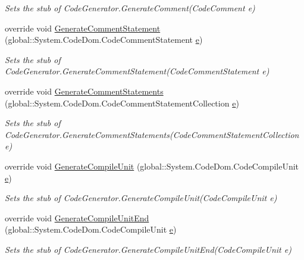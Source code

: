 \begin{DoxyCompactItemize}
\begin{DoxyCompactList}\small\item\em Sets the stub of Code\-Generator.\-Generate\-Comment(\-Code\-Comment e)\end{DoxyCompactList}\item 
override void \hyperlink{class_system_1_1_code_dom_1_1_compiler_1_1_fakes_1_1_stub_code_generator_aa9482055f9a2cd750742792045463463}{Generate\-Comment\-Statement} (global\-::\-System.\-Code\-Dom.\-Code\-Comment\-Statement \hyperlink{jquery-1_810_82_8min_8js_a2c038346d47955cbe2cb91e338edd7e1}{e})
\begin{DoxyCompactList}\small\item\em Sets the stub of Code\-Generator.\-Generate\-Comment\-Statement(\-Code\-Comment\-Statement e)\end{DoxyCompactList}\item 
override void \hyperlink{class_system_1_1_code_dom_1_1_compiler_1_1_fakes_1_1_stub_code_generator_a9ccd5fc854601006f2ad5fc38caa4ea1}{Generate\-Comment\-Statements} (global\-::\-System.\-Code\-Dom.\-Code\-Comment\-Statement\-Collection \hyperlink{jquery-1_810_82_8min_8js_a2c038346d47955cbe2cb91e338edd7e1}{e})
\begin{DoxyCompactList}\small\item\em Sets the stub of Code\-Generator.\-Generate\-Comment\-Statements(\-Code\-Comment\-Statement\-Collection e)\end{DoxyCompactList}\item 
override void \hyperlink{class_system_1_1_code_dom_1_1_compiler_1_1_fakes_1_1_stub_code_generator_a2886b7e73a9f6806eb4366bf9011433a}{Generate\-Compile\-Unit} (global\-::\-System.\-Code\-Dom.\-Code\-Compile\-Unit \hyperlink{jquery-1_810_82_8min_8js_a2c038346d47955cbe2cb91e338edd7e1}{e})
\begin{DoxyCompactList}\small\item\em Sets the stub of Code\-Generator.\-Generate\-Compile\-Unit(\-Code\-Compile\-Unit e)\end{DoxyCompactList}\item 
override void \hyperlink{class_system_1_1_code_dom_1_1_compiler_1_1_fakes_1_1_stub_code_generator_a2ce518f411fccb9fde3f962c95885763}{Generate\-Compile\-Unit\-End} (global\-::\-System.\-Code\-Dom.\-Code\-Compile\-Unit \hyperlink{jquery-1_810_82_8min_8js_a2c038346d47955cbe2cb91e338edd7e1}{e})
\begin{DoxyCompactList}\small\item\em Sets the stub of Code\-Generator.\-Generate\-Compile\-Unit\-End(\-Code\-Compile\-Unit e)\end{DoxyCompactList}\item 

\end{DoxyCompactItemize}
